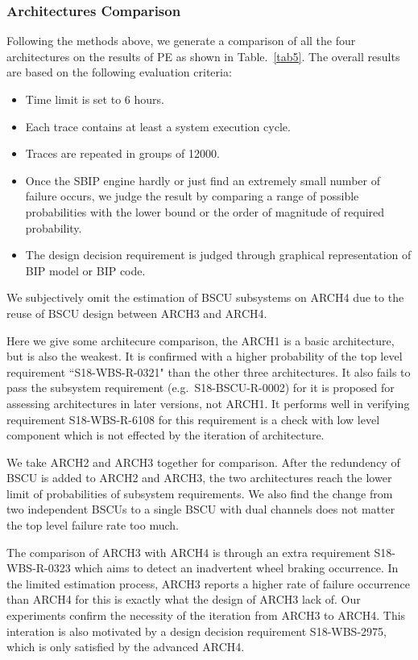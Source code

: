 \subsubsection{Architectures Comparison}
Following the methods above, we generate a comparison of all the four architectures on the results of PE as shown in Table.~\ref{tab5}. The overall results are based on the following evaluation criteria: 

\begin{itemize}
	\item Time limit is set to 6 hours.
	\item Each trace contains at least a system execution cycle.
	\item Traces are repeated in groups of 12000.
	\item Once the SBIP engine hardly or just find an extremely small number of failure occurs, we judge the result by comparing a range of possible probabilities with the lower bound or the order of magnitude of required probability.  
	\item The design decision requirement is judged through graphical representation of BIP model or BIP code.
\end{itemize}

We subjectively omit the estimation of BSCU subsystems on ARCH4 due to the reuse of BSCU design between ARCH3 and ARCH4.

Here we give some architecure comparison, the ARCH1 is a basic architecture, but is also the weakest. It is confirmed with a higher probability of the top level requirement ``S18-WBS-R-0321" than the other three architectures. It also fails to pass the subsystem requirement (e.g.\ S18-BSCU-R-0002) for it is proposed for assessing architectures in later versions, not ARCH1. It performs well in verifying requirement S18-WBS-R-6108 for this requirement is a check with low level component which is not effected by the iteration of architecture.

We take ARCH2 and ARCH3 together for comparison. After the redundency of BSCU is added to ARCH2 and ARCH3, the two architectures reach the lower limit of probabilities of subsystem requirements. We also find the change from two independent BSCUs to a single BSCU with dual channels does not matter the top level failure rate too much.

The comparison of ARCH3 with ARCH4 is through an extra requirement S18-WBS-R-0323 which aims to detect an inadvertent wheel braking occurrence. In the limited estimation process, ARCH3 reports a higher rate of failure occurrence than ARCH4 for this is exactly what the design of ARCH3 lack of. Our experiments confirm the necessity of the iteration from ARCH3 to ARCH4. This interation is also motivated by a design decision requirement S18-WBS-2975, which is only satisfied by the advanced ARCH4. 

